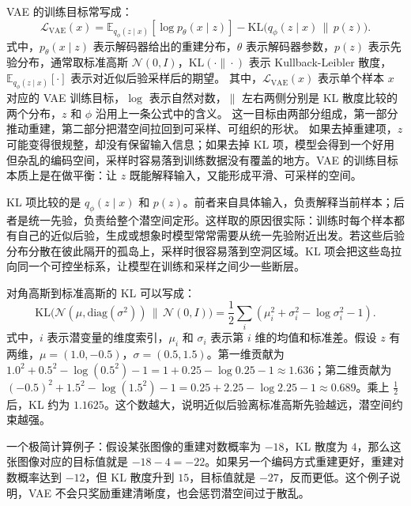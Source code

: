 \documentclass[11pt,a4paper]{ctexart}
\begin{document}
VAE 的训练目标常写成：
\begin{equation}
  \mathcal L_{\mathrm{VAE}}(x)
  =
  \mathbb E_{q_\phi(z\mid x)}[\log p_\theta(x\mid z)]
  -
  \mathrm{KL}\!\bigl(q_\phi(z\mid x)\,\|\,p(z)\bigr).
\end{equation}
式中，$p_\theta(x\mid z)$ 表示解码器给出的重建分布，$\theta$ 表示解码器参数，$p(z)$ 表示先验分布，通常取标准高斯 $\mathcal N(0,I)$，$\mathrm{KL}(\cdot\|\cdot)$ 表示 Kullback-Leibler 散度，$\mathbb E_{q_\phi(z\mid x)}[\cdot]$ 表示对近似后验采样后的期望。
其中，$\mathcal L_{\mathrm{VAE}}(x)$ 表示单个样本 $x$ 对应的 VAE 训练目标，$\log$ 表示自然对数，$\|$ 左右两侧分别是 KL 散度比较的两个分布，$z$ 和 $\phi$ 沿用上一条公式中的含义。
这一目标由两部分组成，第一部分推动重建，第二部分把潜空间拉回到可采样、可组织的形状。
如果去掉重建项，$z$ 可能变得很规整，却没有保留输入信息；如果去掉 KL 项，模型会得到一个好用但杂乱的编码空间，采样时容易落到训练数据没有覆盖的地方。VAE 的训练目标本质上是在做平衡：让 $z$ 既能解释输入，又能形成平滑、可采样的空间。

KL 项比较的是 $q_\phi(z\mid x)$ 和 $p(z)$。前者来自具体输入，负责解释当前样本；后者是统一先验，负责给整个潜空间定形。这样取的原因很实际：训练时每个样本都有自己的近似后验，生成或想象时模型常常需要从统一先验附近出发。若这些后验分布分散在彼此隔开的孤岛上，采样时很容易落到空洞区域。KL 项会把这些岛拉向同一个可控坐标系，让模型在训练和采样之间少一些断层。

对角高斯到标准高斯的 KL 可以写成：
\begin{equation}
  \mathrm{KL}\!\bigl(\mathcal N(\mu,\mathrm{diag}(\sigma^2))\,\|\,\mathcal N(0,I)\bigr)
  =
  \frac{1}{2}\sum_i\left(\mu_i^2+\sigma_i^2-\log\sigma_i^2-1\right).
\end{equation}
式中，$i$ 表示潜变量的维度索引，$\mu_i$ 和 $\sigma_i$ 表示第 $i$ 维的均值和标准差。假设 $z$ 有两维，$\mu=(1.0,-0.5)$，$\sigma=(0.5,1.5)$。第一维贡献为 $1.0^2+0.5^2-\log(0.5^2)-1=1+0.25-\log0.25-1\approx1.636$；第二维贡献为 $(-0.5)^2+1.5^2-\log(1.5^2)-1=0.25+2.25-\log2.25-1\approx0.689$。乘上 $\frac12$ 后，KL 约为 $1.1625$。这个数越大，说明近似后验离标准高斯先验越远，潜空间约束越强。

一个极简计算例子：假设某张图像的重建对数概率为 $-18$，KL 散度为 $4$，那么这张图像对应的目标值就是 $-18-4=-22$。如果另一个编码方式重建更好，重建对数概率达到 $-12$，但 KL 散度升到 $15$，目标值就是 $-27$，反而更低。这个例子说明，VAE 不会只奖励重建清晰度，也会惩罚潜空间过于散乱。
\end{document}
